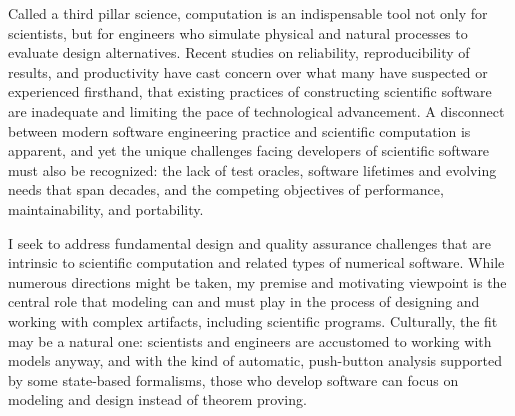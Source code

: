 \documentclass[../../proposal.tex]{subfiles}
\begin{document}
Called a third pillar science, computation is an indispensable tool
not only for scientists, but for engineers who simulate physical and
natural processes to evaluate design alternatives.  Recent studies on
reliability, reproducibility of results, and productivity have cast
concern over what many have suspected or experienced firsthand, that
existing practices of constructing scientific software are inadequate
and limiting the pace of technological advancement.  A disconnect
between modern software engineering practice and scientific
computation is apparent, and yet the unique challenges facing
developers of scientific software must also be recognized: the lack of
test oracles, software lifetimes and evolving needs that span decades,
and the competing objectives of performance, maintainability, and
portability.

I seek to address fundamental design and quality assurance challenges
that are intrinsic to scientific computation and related types of
numerical software.  While numerous directions might be taken, my
premise and motivating viewpoint is the central role that modeling can
and must play in the process of designing and working with complex
artifacts, including scientific programs.  Culturally, the fit may be
a natural one: scientists and engineers are accustomed to working with
models anyway, and with the kind of automatic, push-button analysis
supported by some state-based formalisms, those who develop software
can focus on modeling and design instead of theorem proving.
\end{document}
